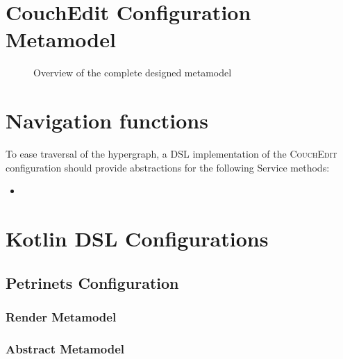 \chapter{CouchEdit Configuration Metamodel}
\begin{sidewaysfigure}
\centering

\caption{Overview of the complete designed metamodel}
\label{fig:complete-metamodel}
\end{sidewaysfigure}

\chapter{Navigation functions}
\label{app:navigationfunctions}

To ease traversal of the hypergraph, a DSL implementation of the \textsc{CouchEdit} configuration should provide abstractions for the following Service methods:

\begin{itemize}
  \item {}
\end{itemize}


\chapter{Kotlin DSL Configurations}
\section{Petrinets Configuration}
\label{app:petri}
\subsection*{Render Metamodel}


\subsection*{Abstract Metamodel}


